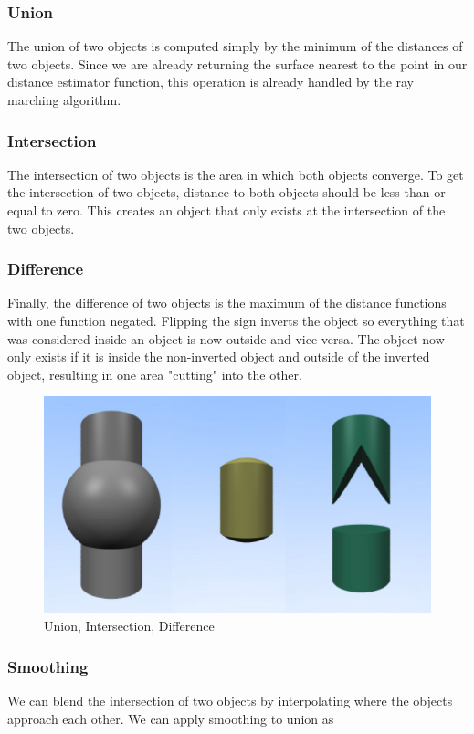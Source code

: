 \documentclass[sigconf, nonacm]{acmart}
\begin{document}
\subsubsection{Union}
The union of two objects is computed simply by the minimum of the distances of two objects. Since we are already returning the surface nearest to the point in our distance estimator function, this operation is already handled by the ray marching algorithm.

\subsubsection{Intersection}
The intersection of two objects is the area in which both objects converge. To get the intersection of two objects, distance to both objects should be less than or equal to zero. This creates an object that only exists at the intersection of the two objects.

\subsubsection{Difference}
Finally, the difference of two objects is the maximum of the distance functions with one function negated. Flipping the sign inverts the object so everything that was considered inside an object is now outside and vice versa. The object now only exists if it is inside the non-inverted object and outside of the inverted object, resulting in one area "cutting" into the other. 

\begin{figure}
  \includegraphics[width=0.75\linewidth]{images/union-intersection-difference.png}
  \caption{Union, Intersection, Difference}
\end{figure}

\subsubsection{Smoothing}
We can blend the intersection of two objects by interpolating where the objects approach each other. We can apply smoothing to union as
\end{document}
